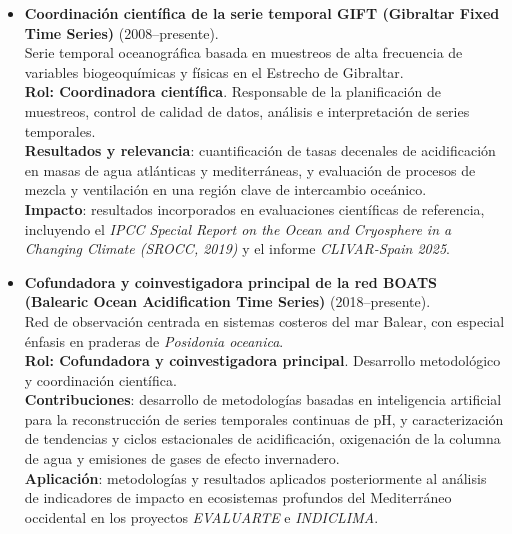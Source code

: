 \documentclass[11pt,a4paper]{article}
\begin{document}
\begin{itemize}[leftmargin=*]

    \item \textbf{Coordinación científica de la serie temporal GIFT (Gibraltar Fixed Time Series)} (2008--presente).\\
    Serie temporal oceanográfica basada en muestreos de alta frecuencia de variables biogeoquímicas y físicas en el Estrecho de Gibraltar.\\
    \textbf{Rol: Coordinadora científica}. Responsable de la planificación de muestreos, control de calidad de datos, análisis e interpretación de series temporales.\\
    \textbf{Resultados y relevancia}: cuantificación de tasas decenales de acidificación en masas de agua atlánticas y mediterráneas, y evaluación de procesos de mezcla y ventilación en una región clave de intercambio oceánico.\\
    \textbf{Impacto}: resultados incorporados en evaluaciones científicas de referencia, incluyendo el \textit{IPCC Special Report on the Ocean and Cryosphere in a Changing Climate (SROCC, 2019)} y el informe \textit{CLIVAR-Spain 2025}.

    \item \textbf{Cofundadora y coinvestigadora principal de la red BOATS (Balearic Ocean Acidification Time Series)} (2018--presente).\\
    Red de observación centrada en sistemas costeros del mar Balear, con especial énfasis en praderas de \textit{Posidonia oceanica}.\\
    \textbf{Rol: Cofundadora y coinvestigadora principal}. Desarrollo metodológico y coordinación científica.\\
    \textbf{Contribuciones}: desarrollo de metodologías basadas en inteligencia artificial para la reconstrucción de series temporales continuas de pH, y caracterización de tendencias y ciclos estacionales de acidificación, oxigenación de la columna de agua y emisiones de gases de efecto invernadero.\\
    \textbf{Aplicación}: metodologías y resultados aplicados posteriormente al análisis de indicadores de impacto en ecosistemas profundos del Mediterráneo occidental en los proyectos \textit{EVALUARTE} e \textit{INDICLIMA}.


\end{itemize}
\end{document}
